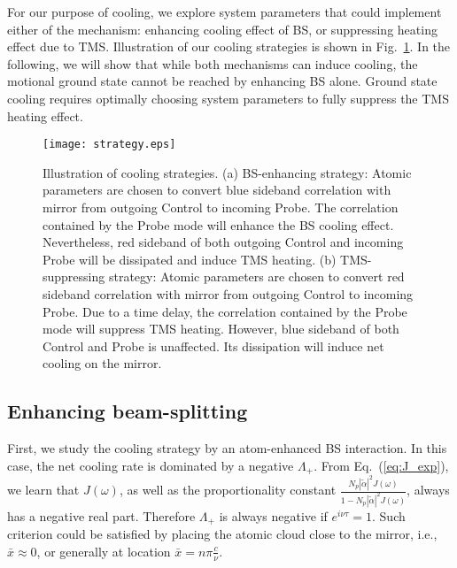 \documentclass[aps, pra, reprint, amsmath, amssymb, groupedaddress, acknowledgments]{revtex4-1}
\begin{document}
For our purpose of cooling, we explore system parameters that could implement either of the mechanism: enhancing cooling effect of BS, or suppressing heating effect due to TMS.  Illustration of our cooling strategies is shown in Fig.~\ref{fig:strategy}.  In the following, we will show that 
while both mechanisms can induce cooling, the motional ground state cannot be reached by enhancing BS alone.  Ground state cooling requires optimally choosing system parameters to fully suppress the TMS heating effect.

\begin{figure}
\begin{center}
\texttt{[image: strategy.eps]}
\caption{ \label{fig:strategy} Illustration of cooling strategies. (a) BS-enhancing strategy: Atomic parameters are chosen to convert blue sideband correlation with mirror from outgoing Control to incoming Probe.  The correlation contained by the Probe mode will enhance the BS cooling effect.  Nevertheless, red sideband of both outgoing Control and incoming Probe will be dissipated and induce TMS heating.  (b) TMS-suppressing strategy: Atomic parameters are chosen to convert red sideband correlation with mirror from outgoing Control to incoming Probe.  Due to a time delay, the correlation contained by the Probe mode will suppress TMS heating.  However, blue sideband of both Control and Probe is unaffected.  Its dissipation will induce net cooling on the mirror.}
\end{center}
\end{figure}

\subsection{Enhancing beam-splitting \label{ssec:BS}}

First, we study the cooling strategy by an atom-enhanced BS interaction.  In this case, the net cooling rate is dominated by a negative $\Lambda_+$.  From Eq.~(\ref{eq:J_exp}), we learn that $J(\omega)$, as well as the proportionality constant $\frac{N_p |\tilde{\alpha}|^2 J(\omega)}{1- N_p |\tilde{\alpha}|^2 J(\omega)}$, always has a negative real part.  Therefore $\Lambda_+$ is always negative if $e^{i\nu \tau}=1$.  Such criterion could be satisfied by placing the atomic cloud close to the mirror, i.e., $\bar{x}\approx 0$, or generally at location $\bar{x}=n\pi\frac{c}{\nu}$.
\end{document}

